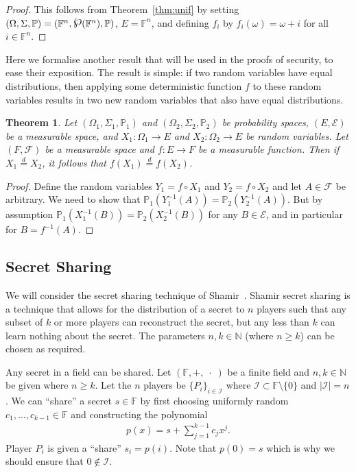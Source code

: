 \documentclass{article}
\newcommand{\eqd}[0]{\stackrel{d}{=}}
\newcommand{\powerset}{\raisebox{.15\baselineskip}{\Large\ensuremath{\wp}}}
\newtheorem{theorem}{Theorem}
\theoremstyle{remark}
\newcommand{\N}{\mathbb{N}}
\newcommand{\F}{\mathbb{F}}
\renewcommand{\P}{\mathbb{P}}
\begin{document}
\begin{proof}
	This follows from Theorem~\ref{thm:unif} by setting $(\Omega, \Sigma, \P) =
	(\F^n, \powerset(\F^n), \P)$, $E = \F^n$, and defining $f_i$ by
	$f_i(\omega) = \omega + i$ for all $i \in \F^n$.
\end{proof}

Here we formalise another result that will be used in the proofs of security,
to ease their exposition. The result is simple: if two random variables have
equal distributions, then applying some deterministic function $f$ to these
random variables results in two new random variables that also have equal
distributions.

\begin{theorem}\label{thm:eqd_det}
	Let $(\Omega_1, \Sigma_1, \P_1)$ and $(\Omega_2, \Sigma_2, \P_2)$ be
	probability spaces, $(E, \mathcal{E})$ be a measurable space, and $X_1:
	\Omega_1 \to E$ and $X_2: \Omega_2 \to E$ be random variables. Let $(F,
	\mathcal{F})$ be a measurable space and $f: E \to F$ be a measurable
	function. Then if $X_1 \eqd X_2$, it follows that $f(X_1) \eqd f(X_2)$.
\end{theorem}

\begin{proof}
	Define the random variables $Y_1 = f \circ X_1$ and $Y_2 = f \circ X_2$ and
	let $A \in \mathcal{F}$ be arbitrary. We need to show that
	$\P_1(Y_1^{-1}(A)) = \P_2(Y_2^{-1}(A))$. But by assumption
	$\P_1(X_1^{-1}(B)) = \P_2(X_2^{-1}(B))$ for any $B \in \mathcal{E}$, and in
	particular for $B = f^{-1}(A)$.
\end{proof}

\subsection{Secret Sharing}\label{sec:sss}

\newcommand{\spl}[1][k]{\vartheta_{#1}}

We will consider the secret sharing technique of Shamir~\cite{shamir_1979}.
Shamir secret sharing is a technique that allows for the distribution of a
secret to $n$ players such that any subset of $k$ or more players can
reconstruct the secret, but any less than $k$ can learn nothing about the
secret. The parameters $n, k \in \N$ (where $n \ge k$) can be chosen as
required.

Any secret in a field can be shared. Let $(\F, +, \;\cdot\;)$ be a finite field
and $n, k \in \N$ be given where $n \ge k$. Let the $n$ players be
${\{P_i\}}_{i \in \mathcal{I}}$ where $\mathcal{I} \subset \F \setminus \{0\}$
and $|\mathcal{I}| = n$. We can ``share'' a secret $s \in \F$ by first choosing
uniformly random $c_1, \ldots, c_{k-1} \in \F$ and constructing the polynomial
\begin{align*}
	p(x) = s + \sum_{j=1}^{k-1} c_j x^j.
\end{align*}
Player $P_i$ is given a ``share'' $s_i = p(i)$. Note that $p(0) = s$ which is
why we should ensure that $0 \notin \mathcal{I}$.
\end{document}
